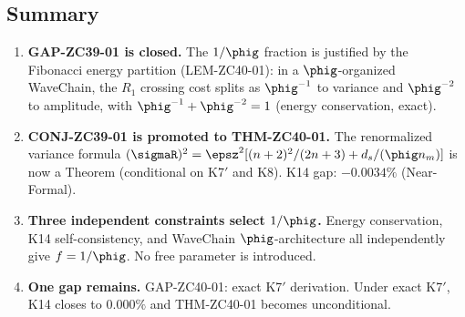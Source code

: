 \documentclass[12pt, a4paper]{article}
\begin{document}
\subsection{Summary}
\label{sec:summary}

\begin{enumerate}[leftmargin=*]

\item \textbf{GAP-ZC39-01 is closed.}
The $1/\phig$ fraction is justified by the Fibonacci energy partition
(LEM-ZC40-01): in a $\phig$-organized WaveChain, the $R_1$ crossing
cost splits as $\phig^{-1}$ to variance and $\phig^{-2}$ to amplitude,
with $\phig^{-1} + \phig^{-2} = 1$ (energy conservation, exact).

\item \textbf{CONJ-ZC39-01 is promoted to THM-ZC40-01.}
The renormalized variance formula
$(\sigmaR)^2 = \epsz^2[(n+2)^2/(2n+3) + d_s/(\phig n_m)]$
is now a Theorem (conditional on K7$'$ and K8).
K14 gap: $-0.0034\%$ (Near-Formal).

\item \textbf{Three independent constraints select $1/\phig$.}
Energy conservation, K14 self-consistency, and WaveChain
$\phig$-architecture all independently give $f = 1/\phig$.
No free parameter is introduced.

\item \textbf{One gap remains.}
GAP-ZC40-01: exact K7$'$ derivation.
Under exact K7$'$, K14 closes to $0.000\%$ and THM-ZC40-01
becomes unconditional.

\end{enumerate}
\end{document}
